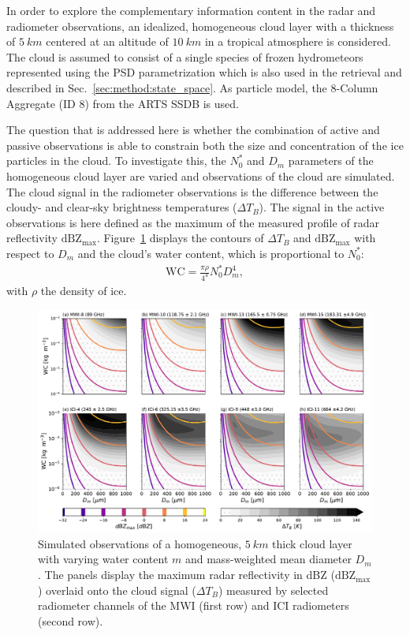 \documentclass[journal abbreviation, manuscript]{copernicus}
\begin{document}
In order to explore the complementary information content in the radar and
radiometer observations, an idealized, homogeneous cloud layer with a thickness
of $5\ \unit{km}$ centered at an altitude of $10\ \unit{km}$ in a tropical
atmosphere is considered. The cloud is assumed to consist of a single species of
frozen hydrometeors represented using the PSD parametrization which is also used
in the retrieval and described in Sec.~\ref{sec:method:state_space}. As particle
model, the 8-Column Aggregate (ID 8) from the ARTS SSDB is used.

The question that is addressed here is whether the combination of active and
passive observations is able to constrain both the size and concentration of the
ice particles in the cloud. To investigate this, the $N_0^*$ and $D_m$
parameters of the homogeneous cloud layer are varied and observations of the
cloud are simulated. The cloud signal in the radiometer observations is the
difference between the cloudy- and clear-sky brightness temperatures ($\Delta
T_B$). The signal in the active observations is here defined as the maximum of
the measured profile of radar reflectivity $\text{dBZ}_\text{max}$.
Figure~\ref{fig:contours} displays the contours of $\Delta T_B$ and
$\text{dBZ}_\text{max}$ with respect to $D_m$ and the cloud's water content,
which is proportional to $N_0^*$:
\begin{align}
\text{WC} = \frac{\pi \rho}{4 ^ 4}N_0^* D_m^4,
\end{align}
with $\rho$ the density of ice.

\begin{figure}
\centering
\includegraphics[width = 1.0\textwidth]{../plots/contours}
\caption{Simulated observations of a homogeneous, $5\ \unit{km}$ thick cloud
  layer with varying water content $m$ and mass-weighted mean diameter $D_m$.
  The panels display the maximum radar reflectivity in dBZ
  ($\text{dBZ}_\text{max}$) overlaid onto the cloud signal ($\Delta T_B$)
  measured by selected radiometer channels of the MWI (first row) and ICI
  radiometers (second row).}
\label{fig:contours}
\end{figure}
\end{document}
